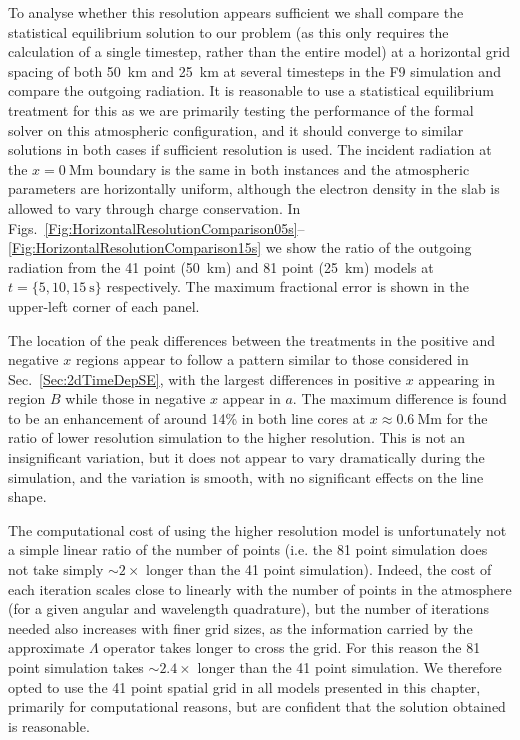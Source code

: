 To analyse whether this resolution appears sufficient we shall compare the statistical equilibrium solution to our problem (as this only requires the calculation of a single timestep, rather than the entire model) at a horizontal grid spacing of both \SI{50}{\kilo\metre} and \SI{25}{\kilo\metre} at several timesteps in the F9 simulation and compare the outgoing radiation.
It is reasonable to use a statistical equilibrium treatment for this as we are primarily testing the performance of the formal solver on this atmospheric configuration, and it should converge to similar solutions in both cases if sufficient resolution is used.
The incident radiation at the $x=\SI{0}{\mega\metre}$ boundary is the same in both instances and the atmospheric parameters are horizontally uniform, although the electron density in the slab is allowed to vary through charge conservation.
In Figs.~\ref{Fig:HorizontalResolutionComparison05s}--\ref{Fig:HorizontalResolutionComparison15s} we show the ratio of the outgoing radiation from the 41 point (\SI{50}{\kilo\metre}) and 81 point (\SI{25}{\kilo\metre}) models at $t=\{5, 10, \SI{15}{\second}\}$ respectively.
The maximum fractional error is shown in the upper-left corner of each panel.

The location of the peak differences between the treatments in the positive and negative $x$ regions appear to follow a pattern similar to those considered in Sec.~\ref{Sec:2dTimeDepSE}, with the largest differences in positive $x$ appearing in region $B$ while those in negative $x$ appear in $a$.
The maximum difference is found to be an enhancement of around 14\% in both line cores at $x\approx\SI{0.6}{\mega\metre}$ for the ratio of lower resolution simulation to the higher resolution.
This is not an insignificant variation, but it does not appear to vary dramatically during the simulation, and the variation is smooth, with no significant effects on the line shape.

The computational cost of using the higher resolution model is unfortunately not a simple linear ratio of the number of points (i.e. the 81 point simulation does not take simply $\sim 2\times$ longer than the 41 point simulation).
Indeed, the cost of each iteration scales close to linearly with the number of points in the atmosphere (for a given angular and wavelength quadrature), but the number of iterations needed also increases with finer grid sizes, as the information carried by the approximate $\Lambda$ operator takes longer to cross the grid.
For this reason the 81 point simulation takes $\sim 2.4\times$ longer than the 41 point simulation.
We therefore opted to use the 41 point spatial grid in all models presented in this chapter, primarily for computational reasons, but are confident that the solution obtained is reasonable.


